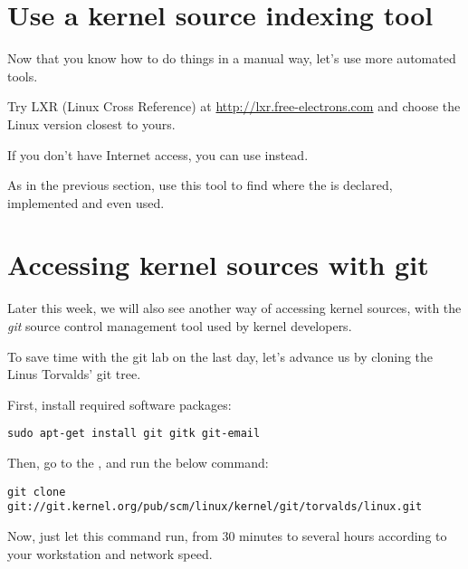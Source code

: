 \section{Use a kernel source indexing tool}

Now that you know how to do things in a manual way, let's use more
automated tools.

Try LXR (Linux Cross Reference) at \url{http://lxr.free-electrons.com}
and choose the Linux version closest to yours.

If you don't have Internet access, you can use  instead.

As in the previous section, use this tool to find where
the  is declared, implemented and
even used.

\section{Accessing kernel sources with git}

Later this week, we will also see another way of accessing kernel
sources, with the {\em git} source control management tool used by kernel
developers.

To save time with the git lab on the last day, let's advance us by
cloning the Linus Torvalds' git tree.

First, install required software packages:

\begin{verbatim}
sudo apt-get install git gitk git-email
\end{verbatim}

Then, go to the , and run
the below command:

\small
\begin{verbatim}
git clone git://git.kernel.org/pub/scm/linux/kernel/git/torvalds/linux.git
\end{verbatim}
\normalsize

Now, just let this command run, from 30 minutes to several hours
according to your workstation and network speed.
